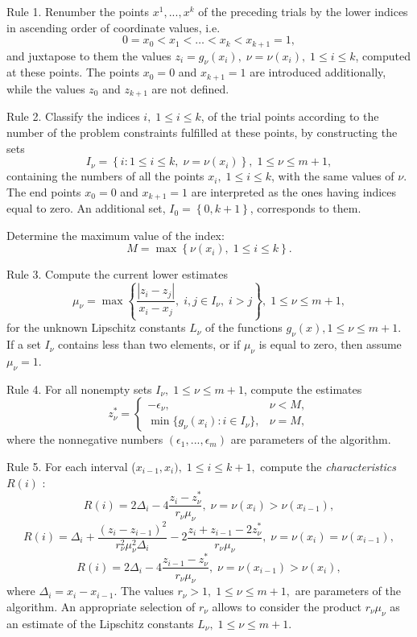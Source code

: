 \documentclass[a4paper]{jpconf}
\begin{document}
Rule 1. Renumber the points $x^1,...,x^k$ of the preceding trials by the
lower indices in ascending order of coordinate values, i.e.
\[
0=x_0<x_1<\dots <x_k<x_{k+1}=1,
\]
and juxtapose to them the values $z_i=g_\nu(x_i), \; \nu=\nu(x_i), \; 1
\leq i \leq k$, computed at these points. The points $x_0=0$ and
$x_{k+1}=1$ are introduced additionally, while the values $z_0$ and
$z_{k+1}$ are not defined.

Rule 2. Classify the indices $i, \; 1 \leq i \leq k$, of the trial points
according to the number of the problem constraints fulfilled at these
points, by constructing the sets
\[
I_\nu =\left\{i:1 \leq i \leq k, \; \nu=\nu(x_i) \right\}, \; 1 \leq \nu \leq m+1,
\]
containing the numbers of all the points $x_i, \; 1 \leq i \leq k$, with
the same values of $\nu$. The end points $x_0=0$ and $x_{k+1}=1$ are
interpreted as the ones having indices equal to zero. An additional set,
$I_0=\left\{0,k+1\right\}$, corresponds to them.

Determine the maximum value of the index:
\[
M=\max\left\{\nu(x_i), \; 1 \leq i \leq k \right \}.
\]

Rule 3. Compute the current lower estimates
\begin{equation}\label{Rule_Mu}
\mu_\nu = \max\left\{ \frac{\left|z_i-z_j\right|}{ x_i - x_j }, \; i,j \in I_\nu, \; i>j \right\}, \; 1 \leq \nu \leq m+1,
\end{equation}
for the unknown Lipschitz constants $L_\nu$ of the functions $g_\nu(x),1
\leq \nu \leq m+1$. If a set $I_\nu$ contains less than two elements, or
if $\mu_\nu$ is equal to zero, then assume $\mu_\nu=1$.

Rule 4. For all nonempty sets $I_\nu, \; 1 \leq \nu \leq m+1$, compute the
estimates
\[
z_\nu^\ast = \left\{
   \begin{array}{lr}
     -\epsilon_\nu, & \nu < M,\\
     \min\{ g_\nu(x_i): i\in I_\nu \}, & \nu = M,
   \end{array}
\right.
 \]
where the nonnegative numbers $(\epsilon_1,...,\epsilon_m)$ are parameters
of the algorithm.

Rule 5. For each interval ($x_{i-1},x_i), \; 1 \leq i \leq k+1,$ compute
the \textit{characteristics} $R(i)$ :
\[
R(i)=2\Delta_i-4\frac{z_i-z_\nu^\ast}{r_\nu \mu_\nu}, \; \nu=\nu(x_i)>\nu(x_{i-1}),
\]
\begin{equation}\label{Rule_R}
R(i)=\Delta_i+\frac{(z_i-z_{i-1})^2}{r_\nu^2 \mu_\nu^2\Delta_i}-2\frac{z_i+z_{i-1}-2z_\nu^\ast}{r_\nu \mu_\nu}, \;  \nu=\nu(x_i)=\nu(x_{i-1}),
\end{equation}
\[
R(i)=2\Delta_i-4\frac{z_{i-1}-z_\nu^\ast}{r_\nu \mu_\nu}, \; \nu=\nu(x_{i-1})>\nu(x_i),
\]
where $\Delta_i=x_i - x_{i-1}$. The values $r_\nu > 1, \; 1 \leq
\nu \leq m+1,$ are parameters of the algorithm. An appropriate selection
of $r_\nu$ allows to consider the product $r_\nu \mu_\nu$ as an estimate
of the Lipschitz constants $L_\nu, \; 1 \leq \nu \leq m+1$.
\end{document}
